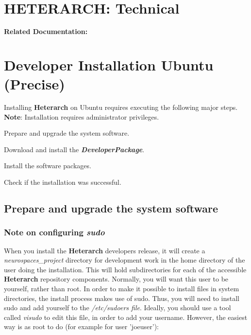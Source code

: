 \documentclass[12pt]{article}
\begin{document}
\section*{HETERARCH: Technical}

{\bf Related Documentation:} \\

\section*{Developer Installation Ubuntu (Precise)}

Installing {\bf\small Heterarch} on Ubuntu requires executing the following major steps. {\bf Note}: Installation requires administrator privileges.
\begin{description}
   \item Prepare and upgrade the system software.
   \item Download and install the {\bf{\emph{DeveloperPackage}}}.
   \item Install the software packages.
   \item Check if the installation was successful. 
\end{description}

\subsection*{Prepare and upgrade the system software}

\subsubsection*{Note on configuring {\emph{sudo}}}

When you install the {\bf\small Heterarch} developers release, it will create a
{\it neurospaces\_project} directory for development work in the home
directory of the user doing the installation.  This will hold
subdirectories for each of the accessible {\bf\small Heterarch} repository components.  Normally, you
will want this user to be yourself, rather than root.  In order to
make it possible to install files in system directories, the install
process makes use of sudo.  Thus, you will need to install sudo and
add yourself to the {\it /etc/sudoers file}.  Ideally, you should use
a tool called {\it visudo} to edit this file, in order to add your
username.  However, the easiest way is as root to do (for example for
user 'joeuser'):
\end{document}
